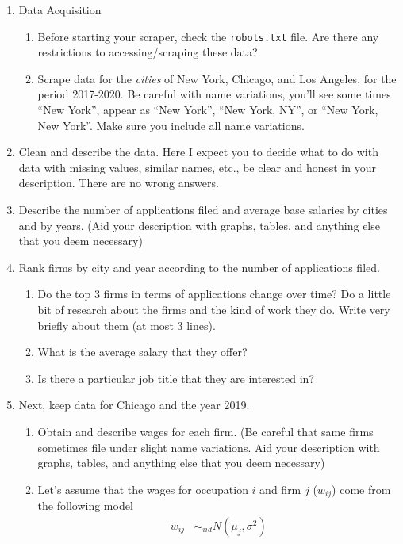 \documentclass[12pt,onecolumn]{article}
\begin{document}
\begin{enumerate}
  \item Data Acquisition
  \begin{enumerate}
  \item Before starting your scraper, check  the \texttt{robots.txt} file. Are there any restrictions to accessing/scraping these data?
  \item Scrape data for the {\it cities} of New York, Chicago, and Los Angeles, for the period 2017-2020. Be careful with name variations, you'll see some times ``New York'', appear as ``New York'', ``New York, NY'', or ``New York, New York''. Make sure you include all name variations. 
  \end{enumerate}  
  \item Clean and describe the data. Here I expect you to decide what to do with data with missing values, similar names, etc., be clear and honest in your description. There are no wrong answers.
  \item Describe the number of applications filed  and average base salaries by cities and by years. (Aid your description with graphs, tables, and anything else that you deem necessary)
  \item Rank firms by city and year according to the number of applications filed.
\begin{enumerate}
   \item Do the top 3 firms in terms of applications change over time? Do a little bit of research about the firms and the kind of work they do. Write very briefly about them (at most 3 lines). 
   \item What is the average salary that they offer? 
   \item Is there a particular job title that they are interested in?  
 \end{enumerate}
  \item Next, keep data for Chicago and the year 2019. 
  \begin{enumerate}
    \item Obtain and describe wages for each firm. (Be careful that same firms sometimes file under slight name variations. Aid your description with graphs, tables, and anything else that you deem necessary)
    \item Let's assume that the wages for occupation $i$ and firm $j$ ($w_{ij}$) come from the following model
    \begin{align}
    w_{ij} &\sim_{iid} N(\mu_j,\sigma^2)
    \end{align}

\end{enumerate}
\end{enumerate}
\end{document}
